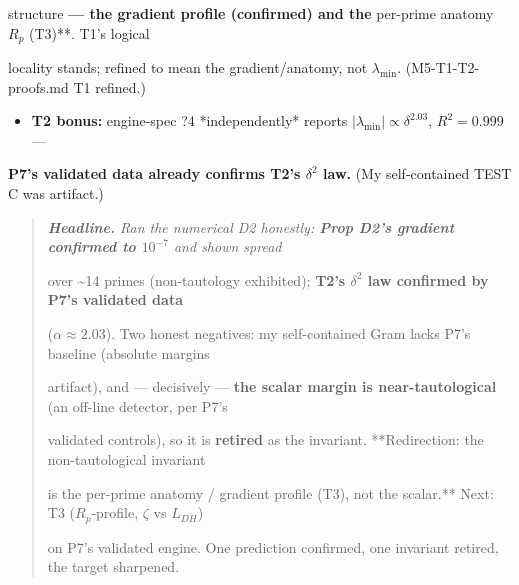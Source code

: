 \documentclass[10pt]{article}
\begin{document}
  structure\textbf{ --- the gradient profile (confirmed) and the }per-prime anatomy $R_p$ (T3)**. T1's logical\par
  locality stands; refined to mean the gradient/anatomy, not $\lambda_{\min}$. (M5-T1-T2-proofs.md T1 refined.)\par
\begin{itemize}
\item \textbf{T2 bonus:} engine-spec ?4 *independently* reports $|\lambda_{\min}|\propto\delta^{2.03}$, $R^2=0.999$ ---
\end{itemize}
  \textbf{P7's validated data already confirms T2's $\delta^2$ law.} (My self-contained TEST C was artifact.)\par

\begin{quote}\itshape
\textbf{Headline.} Ran the numerical D2 honestly: \textbf{Prop D2's gradient confirmed to $10^{-7}$} and shown spread\par
over \textasciitilde{}14 primes (non-tautology exhibited); \textbf{T2's $\delta^2$ law confirmed by P7's validated data}\par
($\alpha\approx2.03$). Two honest negatives: my self-contained Gram lacks P7's baseline (absolute margins\par
artifact), and --- decisively --- \textbf{the scalar margin is near-tautological} (an off-line detector, per P7's\par
validated controls), so it is \textbf{retired} as the invariant. **Redirection: the non-tautological invariant\par
is the per-prime anatomy / gradient profile (T3), not the scalar.** Next: T3 ($R_p$-profile, \ensuremath{\zeta} vs $L_{DH}$)\par
on P7's validated engine. One prediction confirmed, one invariant retired, the target sharpened.\par
\end{quote}
\end{document}
